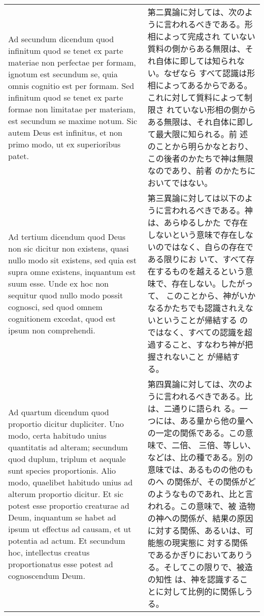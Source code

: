 \documentclass[10pt]{jsarticle} %
\begin{document}
\begin{longtable}{p{21em}p{21em}}
{\sc  Ad secundum dicendum} quod infinitum quod se tenet ex parte
 materiae non perfectae per formam, ignotum est secundum se, quia omnis
 cognitio est per formam. Sed infinitum quod se tenet ex parte formae
 non limitatae per materiam, est secundum se maxime notum. Sic autem
 Deus est infinitus, et non primo modo, ut ex superioribus patet.

&

第二異論に対しては、次のように言われるべきである。形相によって完成され
ていない質料の側からある無限は、それ自体に即しては知られない。なぜなら
すべて認識は形相によってあるからである。これに対して質料によって制限さ
れていない形相の側からある無限は、それ自体に即して最大限に知られる。前
述のことから明らかなとおり、この後者のかたちで神は無限なのであり、前者
のかたちにおいてではない。

\\

{\sc  Ad tertium dicendum} quod Deus non sic dicitur non existens,
 quasi nullo modo sit existens, sed quia est supra omne existens,
 inquantum est suum esse. Unde ex hoc non sequitur quod nullo modo
 possit cognosci, sed quod omnem cognitionem excedat, quod est ipsum non
 comprehendi.

&

第三異論に対しては以下のように言われるべきである。神は、あらゆるしかた
で存在しないという意味で存在しないのではなく、自らの存在である限りにお
いて、すべて存在するものを越えるという意味で、存在しない。したがって、
このことから、神がいかなるかたちでも認識されえないということが帰結する
のではなく、すべての認識を超過すること、すなわち神が把握されないこと
が帰結する。

\\

{\sc Ad quartum dicendum} quod proportio dicitur dupliciter. Uno modo,
certa habitudo unius quantitatis ad alteram; secundum quod duplum,
triplum et aequale sunt species proportionis. Alio modo, quaelibet
habitudo unius ad alterum proportio dicitur. Et sic potest esse
proportio creaturae ad Deum, inquantum se habet ad ipsum ut effectus
ad causam, et ut potentia ad actum. Et secundum hoc, intellectus
creatus proportionatus esse potest ad cognoscendum Deum.

&

第四異論に対しては、次のように言われるべきである。比は、二通りに語られ
る。一つには、ある量から他の量への一定の関係である。この意味で、二倍、
三倍、等しい、などは、比の種である。別の意味では、あるものの他のものへ
の関係が、その関係がどのようなものであれ、比と言われる。この意味で、被
造物の神への関係が、結果の原因に対する関係、あるいは、可能態の現実態に
対する関係であるかぎりにおいてありうる。そしてこの限りで、被造の知性
は、神を認識することに対して比例的に関係しうる。

\end{longtable}
\end{document}
